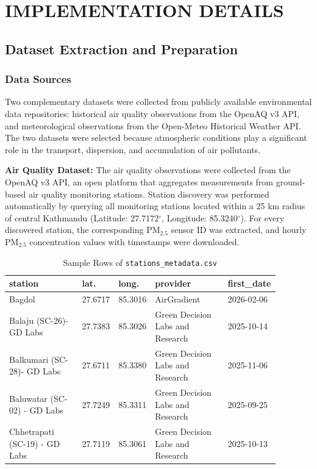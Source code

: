 \chapter{IMPLEMENTATION DETAILS}

\section{Dataset Extraction and Preparation}

\subsection{Data Sources}

Two complementary datasets were collected from publicly available environmental data
repositories: historical air quality observations from the OpenAQ v3 API, and
meteorological observations from the Open-Meteo Historical Weather API. The two
datasets were selected because atmospheric conditions play a significant role in the
transport, dispersion, and accumulation of air pollutants.

\textbf{Air Quality Dataset:} The air quality observations were collected from the
OpenAQ v3 API, an open platform that aggregates measurements from ground-based air
quality monitoring stations. Station discovery was performed automatically by querying
all monitoring stations located within a 25 km radius of central Kathmandu (Latitude:
27.7172$^\circ$, Longitude: 85.3240$^\circ$). For every discovered station, the
corresponding PM$_{2.5}$ sensor ID was extracted, and hourly PM$_{2.5}$ concentration
values with timestamps were downloaded.

\begin{table}[H]
    \centering
    \small
    \caption{Sample Rows of \texttt{stations\_metadata.csv}}
    \label{tab:stations_metadata_sample}
    \renewcommand{\arraystretch}{1.3}
    \begin{tabular}{|p{0.28\linewidth}|p{0.09\linewidth}|p{0.09\linewidth}|p{0.28\linewidth}|p{0.14\linewidth}|}
        \hline
        \textbf{station} & \textbf{lat.} & \textbf{long.} & \textbf{provider} & \textbf{first\_date} \\
        \hline
        Bagdol & 27.6717 & 85.3016 & AirGradient & 2026-02-06 \\
        \hline
        Balaju (SC-26)- GD Labs & 27.7383 & 85.3026 & Green Decision Labs and Research & 2025-10-14 \\
        \hline
        Balkumari (SC-28)- GD Labs & 27.6711 & 85.3380 & Green Decision Labs and Research & 2025-11-06 \\
        \hline
        Baluwatar (SC-02) - GD Labs & 27.7249 & 85.3311 & Green Decision Labs and Research & 2025-09-25 \\
        \hline
        Chhetrapati (SC-19) - GD Labs & 27.7119 & 85.3061 & Green Decision Labs and Research & 2025-10-13 \\
        \hline
    \end{tabular}
\end{table}

